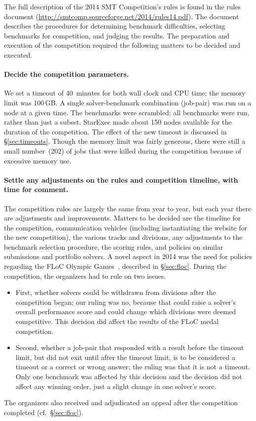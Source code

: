\documentclass[twoside,11pt]{article}
\begin{document}
The full description of the 2014 SMT Competition's rules is found in the rules document (\url{http://smtcomp.sourceforge.net/2014/rules14.pdf}). The document describes the procedures for determining benchmark difficulties, selecting benchmarks for competition, and judging the results. The preparation and execution of the competition required the following matters to be decided and executed.

\paragraph{Decide the competition parameters.} We set a timeout of 40~minutes for both wall clock and CPU time; the memory limit was 100\,GB. A single solver-benchmark combination (job-pair) was run on a node at a given time. The benchmarks were scrambled; all benchmarks were run, rather than just a subset. StarExec made about 150 nodes available for the duration of the competition.
The effect of the new timeout is discussed in \S\ref{sec:timeouts}. Though the memory limit was fairly generous, there were still a small number~(202) of jobs that were killed during the competition because of excessive memory use.

\paragraph{Settle any adjustments on the rules and competition timeline, with time for comment.}
The competition rules are largely the same from year to year, but each year there are adjustments and improvements. Matters to be decided are the timeline for the competition, communication vehicles (including instantiating the website for the new competition), the various tracks and divisions, any adjustments to the benchmark selection procedure, the scoring rules, and policies on similar submissions and portfolio solvers. A novel aspect in 2014 was the need for policies regarding the FLoC Olympic Games~\cite{FLoCGames}, described in \S\ref{sec:floc}. During the competition, the organizers had to rule on two issues.
\begin{itemize}[noitemsep,nolistsep]
\item First, whether solvers could be withdrawn from divisions after the competition began; our ruling was no, because that could raise a solver's overall performance score and could change which divisions were deemed competitive. This decision did affect the results of the FLoC medal competition.
\item Second, whether a job-pair that responded with a result before the timeout limit, but did not exit until after the timeout limit, is to be considered a timeout or a correct or wrong answer; the ruling was that it is not a timeout. Only one benchmark was affected by this decision and the decision did not affect any winning order, just a slight change in one solver's score.
\end{itemize}
The organizers also received and adjudicated an appeal after the competition completed (cf.~\S\ref{sec:floc}).
\end{document}
